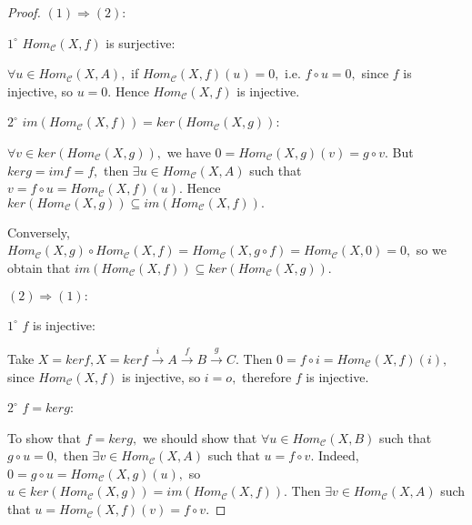\begin{proof}
$(1)\Longrightarrow(2):$

$\mathit{1^{\circ}}$ $Hom_{\mathscr{C}}(X,f)$ is surjective:

$\forall u\in Hom_{\mathscr{C}}(X,A),$ if
$Hom_{\mathscr{C}}(X,f)(u)=0,$ i.e. $f\circ u=0,$ since $f$ is
injective, so $u=0.$ Hence $Hom_{\mathscr{C}}(X,f)$ is injective.

$\mathit{2^{\circ}}$
$im(Hom_{\mathscr{C}}(X,f))=ker(Hom_{\mathscr{C}}(X,g)):$

$\forall v\in ker(Hom_{\mathscr{C}}(X,g)),$ we have
$0=Hom_{\mathscr{C}}(X,g)(v)=g\circ v.$ But $kerg=imf=f,$ then
$\exists u\in Hom_{\mathscr{C}}(X,A)$ such that $v=f\circ
u=Hom_{\mathscr{C}}(X,f)(u).$ Hence
$ker(Hom_{\mathscr{C}}(X,g))\subseteq im(Hom_{\mathscr{C}}(X,f)).$

Conversely, $Hom_{\mathscr{C}}(X,g)\circ Hom_{\mathscr{C}}(X,f) =
Hom_{\mathscr{C}}(X,g\circ f) = Hom_{\mathscr{C}}(X,0)=0,$ so we
obtain that $im(Hom_{\mathscr{C}}(X,f))\subseteq
ker(Hom_{\mathscr{C}}(X,g)).$

$(2)\Longrightarrow(1):$

$\mathit{1^{\circ}}$ $f$ is injective:

Take $X=kerf, X=kerf\stackrel{i}{\rightarrow}
A\stackrel{f}{\rightarrow} B\stackrel{g}{\rightarrow} C.$ Then
$0=f\circ i=Hom_{\mathscr{C}}(X,f)(i),$ since
$Hom_{\mathscr{C}}(X,f)$ is injective, so $i=o,$ therefore $f$ is
injective.

$\mathit{2^{\circ}}$ $f=kerg:$

To show that $f=kerg,$ we should show that $\forall u\in
Hom_{\mathscr{C}}(X,B)$ such that $g\circ u=0,$ then $\exists v\in
Hom_{\mathscr{C}}(X,A)$ such that $u=f\circ v.$ Indeed, $0=g\circ
u=Hom_{\mathscr{C}}(X,g)(u),$ so $u\in
ker(Hom_{\mathscr{C}}(X,g))=im(Hom_{\mathscr{C}}(X,f)).$ Then
$\exists v\in Hom_{\mathscr{C}}(X,A)$ such that
$u=Hom_{\mathscr{C}}(X,f)(v)=f\circ v.$
\end{proof}
